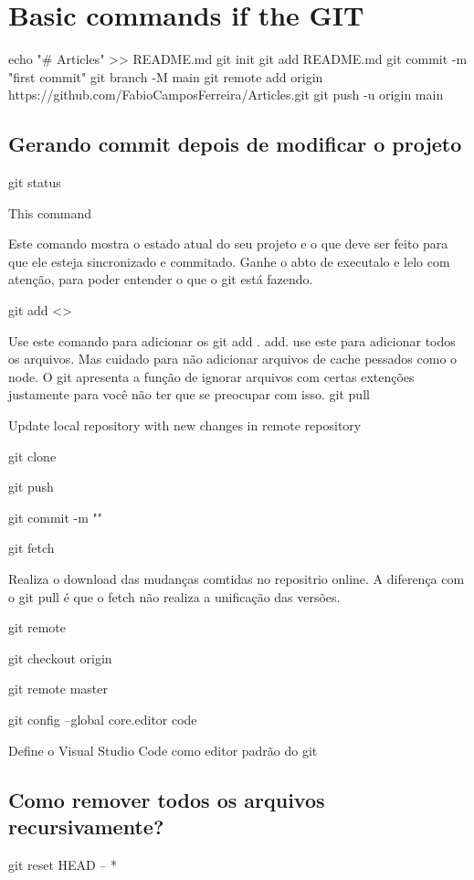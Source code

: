 \chapter{Basic commands if the GIT} 
echo "# Articles" >> README.md
git init
git add README.md
git commit -m "first commit"
git branch -M main
git remote add origin https://github.com/FabioCamposFerreira/Articles.git
git push -u origin main
 \section{Gerando commit depois de modificar o projeto}
git status

 This command 

 Este comando mostra o estado atual do seu projeto e o que deve ser feito para que ele esteja sincronizado e commitado. Ganhe o abto de executalo e lelo com atenção, para poder entender o que o git está fazendo.

git add <> 

 Use este comando para adicionar os 
git add .
 add. use este para adicionar todos os arquivos. Mas cuidado para não adicionar arquivos de cache pessados como o node. O git apresenta a função de ignorar arquivos com certas extenções justamente para você não ter que se preocupar com isso.
git pull

 Update local repository with new changes in remote	 repository


git clone



git push

git commit -m ""

git fetch

Realiza o download das mudanças comtidas no repositrio online. A diferença com o git pull é que o fetch não realiza a unificação das versões.

git remote

git checkout origin

git remote master

git config --global core.editor code

Define o Visual Studio Code como editor padrão do git

\section{Como remover todos os arquivos recursivamente?}
git reset HEAD -- *


